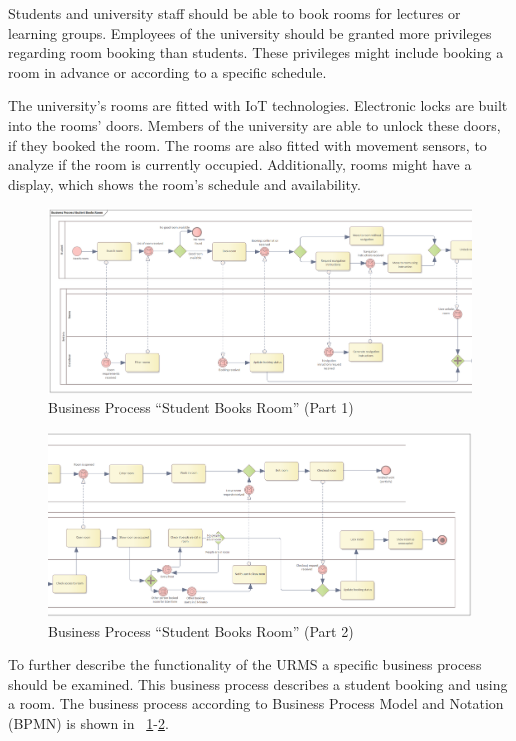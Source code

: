 \documentclass[article,onecolumn]{IEEEtran}
\begin{document}
Students and university staff should be able to book rooms for lectures or learning groups. Employees of the university should be granted more privileges regarding room booking than students. These privileges might include booking a room in advance or according to a specific schedule.

The university's rooms are fitted with IoT technologies.
Electronic locks are built into the rooms' doors. Members of the university are able to unlock these doors, if they booked the room.
The rooms are also fitted with movement sensors, to analyze if the room is currently occupied.
Additionally, rooms might have a display, which shows the room's schedule and availability.

\begin{figure}
	\includegraphics[width=\linewidth]{Figures/BPMN_StudentBooksRoom_1.png}
	\caption{Business Process ``Student Books Room'' (Part 1)}
	\label{fig:bpmn_1}
\end{figure}

\begin{figure}
	\includegraphics[width=\linewidth]{Figures/BPMN_StudentBooksRoom_2.png}
	\caption{Business Process ``Student Books Room'' (Part 2)}
	\label{fig:bpmn_2}
\end{figure}

To further describe the functionality of the URMS a specific business process should be examined. This business process describes a student booking and using a room. The business process according to Business Process Model and Notation (BPMN) is shown in \figurename~\ref{fig:bpmn_1}-\ref{fig:bpmn_2}.
\end{document}
